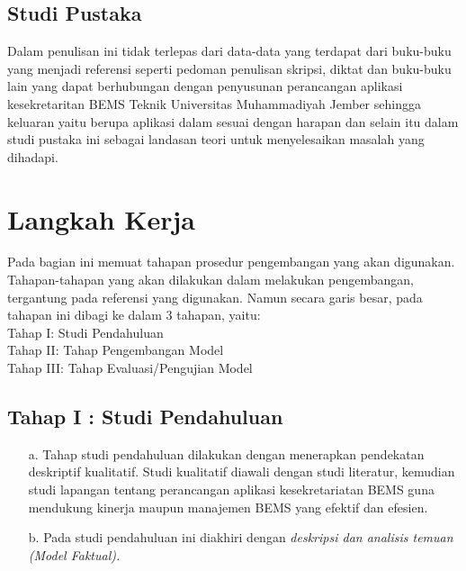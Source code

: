 \documentclass{jtetiproposalskripsi}
\begin{document}
\subsection{Studi Pustaka} 
Dalam penulisan ini tidak terlepas dari data-data yang terdapat dari buku-buku yang menjadi referensi seperti pedoman penulisan skripsi, diktat dan buku-buku lain yang dapat berhubungan dengan penyusunan perancangan aplikasi kesekretaritan BEMS Teknik Universitas Muhammadiyah Jember sehingga keluaran yaitu berupa aplikasi dalam sesuai dengan harapan dan selain itu dalam studi pustaka ini sebagai landasan teori untuk menyelesaikan masalah yang dihadapi.

\section{Langkah Kerja}
Pada bagian ini memuat tahapan prosedur pengembangan yang akan digunakan. Tahapan-tahapan yang akan dilakukan dalam melakukan pengembangan, tergantung pada referensi yang digunakan. Namun secara garis besar, pada tahapan ini dibagi ke dalam 3 tahapan, yaitu:  
\\ Tahap I: Studi Pendahuluan
\\ Tahap II: Tahap Pengembangan Model
\\ Tahap III: Tahap Evaluasi/Pengujian Model
\subsection{Tahap I : Studi Pendahuluan}
\begin{itemize}
\item[a.] Tahap studi pendahuluan dilakukan dengan menerapkan pendekatan deskriptif kualitatif. Studi kualitatif diawali dengan studi literatur, kemudian studi lapangan tentang perancangan aplikasi kesekretariatan BEMS guna mendukung kinerja maupun manajemen BEMS yang efektif dan efesien.
\item[b.] Pada studi pendahuluan ini diakhiri dengan \emph{deskripsi dan analisis temuan (Model Faktual).}
\end{itemize}
\end{document}
